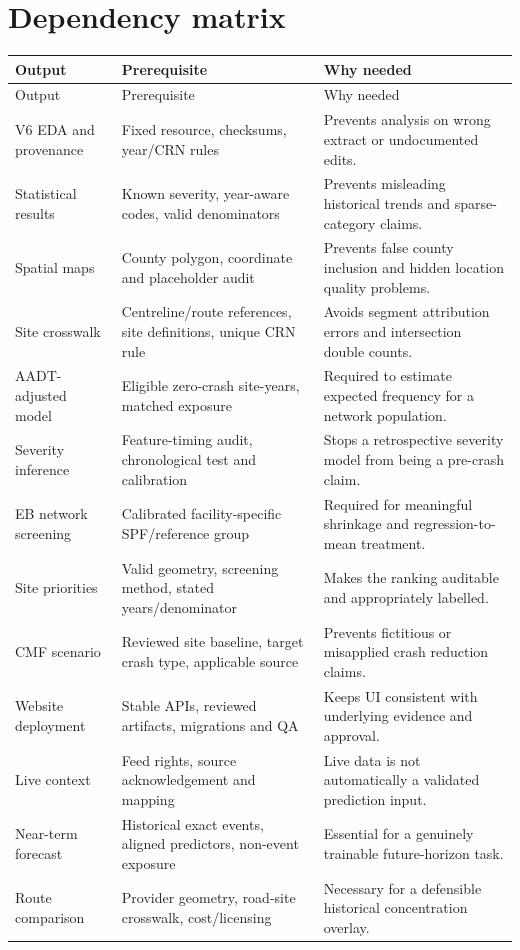 \documentclass[11pt,a4paper,openany]{report}
\begin{document}
\section{Dependency matrix}
\small
\begin{longtable}{@{}L{37mm}L{50mm}L{55mm}@{}}\toprule Output & Prerequisite & Why needed\\\midrule\endfirsthead
\toprule Output & Prerequisite & Why needed\\\midrule\endhead
V6 EDA and provenance & Fixed resource, checksums, year/CRN rules & Prevents analysis on wrong extract or undocumented edits.\\
Statistical results & Known severity, year-aware codes, valid denominators & Prevents misleading historical trends and sparse-category claims.\\
Spatial maps & County polygon, coordinate and placeholder audit & Prevents false county inclusion and hidden location quality problems.\\
Site crosswalk & Centreline/route references, site definitions, unique CRN rule & Avoids segment attribution errors and intersection double counts.\\
AADT-adjusted model & Eligible zero-crash site-years, matched exposure & Required to estimate expected frequency for a network population.\\
Severity inference & Feature-timing audit, chronological test and calibration & Stops a retrospective severity model from being a pre-crash claim.\\
EB network screening & Calibrated facility-specific SPF/reference group & Required for meaningful shrinkage and regression-to-mean treatment.\\
Site priorities & Valid geometry, screening method, stated years/denominator & Makes the ranking auditable and appropriately labelled.\\
CMF scenario & Reviewed site baseline, target crash type, applicable source & Prevents fictitious or misapplied crash reduction claims.\\
Website deployment & Stable APIs, reviewed artifacts, migrations and QA & Keeps UI consistent with underlying evidence and approval.\\
Live context & Feed rights, source acknowledgement and mapping & Live data is not automatically a validated prediction input.\\
Near-term forecast & Historical exact events, aligned predictors, non-event exposure & Essential for a genuinely trainable future-horizon task.\\
Route comparison & Provider geometry, road-site crosswalk, cost/licensing & Necessary for a defensible historical concentration overlay.\\
\bottomrule\end{longtable}
\normalsize
\end{document}
